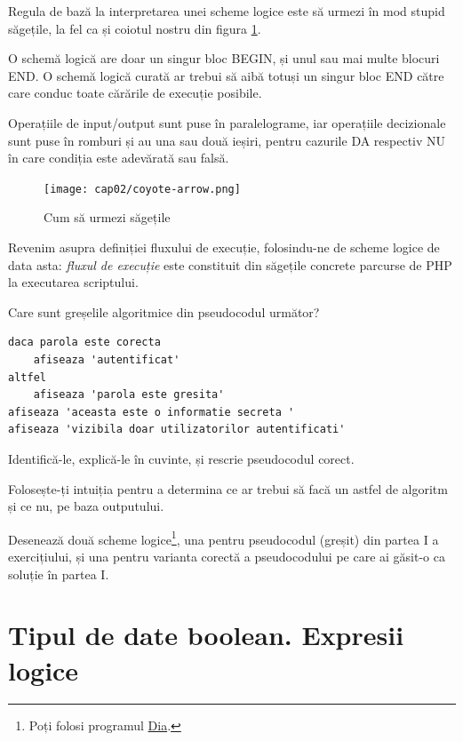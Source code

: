 Regula de bază la interpretarea unei scheme logice
este să urmezi în mod stupid săgețile, la fel ca și
coiotul nostru din figura \ref{fig:coyote arrow}.

O schemă logică are doar un singur bloc {\glqq}BEGIN{\grqq}, și unul
sau mai multe blocuri {\glqq}END{\grqq}. O schemă logică curată
ar trebui să aibă totuși un singur bloc {\glqq}END{\grqq}
către care conduc toate {\glqq}cărările{\grqq} de execuție posibile.

Operațiile de input/output sunt puse în paralelograme,
iar operațiile decizionale sunt puse în romburi și au
una sau două ieșiri, pentru cazurile {\glqq}DA{\grqq} respectiv {\glqq}NU{\grqq}
în care condiția este adevărată sau falsă.

\begin{figure}[ht!]
  \centering
    \texttt{[image: cap02/coyote-arrow.png]}
  \caption{Cum să urmezi săgețile}
  \label{fig:coyote arrow}
\end{figure}

Revenim asupra definiției fluxului de execuție, folosindu-ne de scheme logice de data asta:
\textit{fluxul de execuție} este constituit din săgețile concrete parcurse de PHP
la executarea scriptului.

\begin{Exercise}[difficulty=2,title={Găsește eroarea de logică}]
\ExePart
Care sunt greșelile algoritmice din pseudocodul următor?

\begin{lstlisting}[language=pseudocod]
daca parola este corecta
	afiseaza 'autentificat'
altfel
	afiseaza 'parola este gresita'
afiseaza 'aceasta este o informatie secreta '
afiseaza 'vizibila doar utilizatorilor autentificati'
\end{lstlisting}

Identifică-le, explică-le în cuvinte, și rescrie pseudocodul corect.

Folosește-ți intuiția pentru a determina ce ar trebui
să facă un astfel de algoritm și ce nu, pe baza outputului.

\ExePart
Desenează două scheme logice\footnote{Poți folosi programul
\href{http://projects.gnome.org/dia/}{Dia}.}, una pentru pseudocodul (greșit)
din partea I a exercițiului, și una pentru varianta corectă
a pseudocodului pe care ai găsit-o ca soluție în partea I.
\end{Exercise}


\section{Tipul de date boolean. Expresii logice}
\label{sec:tipul de date boolean. Expresii logice}

